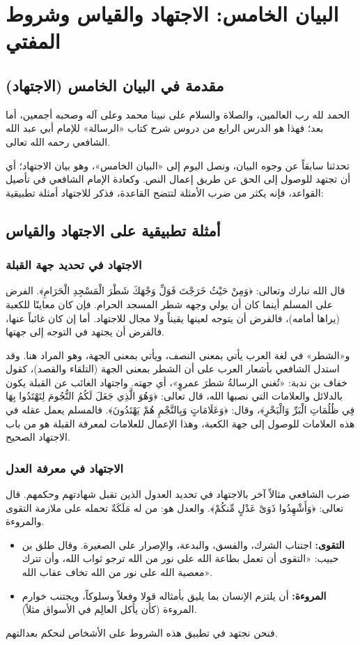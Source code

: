 \chapter{البيان الخامس: الاجتهاد والقياس وشروط المفتي}

\section{مقدمة في البيان الخامس (الاجتهاد)}
الحمد لله رب العالمين، والصلاة والسلام على نبينا محمد وعلى آله وصحبه أجمعين، أما بعد؛ فهذا هو الدرس الرابع من دروس شرح كتاب «الرسالة» للإمام أبي عبد الله الشافعي رحمه الله تعالى.

تحدثنا سابقاً عن وجوه البيان، ونصل اليوم إلى «البيان الخامس»، وهو بيان الاجتهاد؛ أي أن تجتهد للوصول إلى الحق عن طريق إعمال النص. وكعادة الإمام الشافعي في تأصيل القواعد، فإنه يكثر من ضرب الأمثلة لتتضح القاعدة، فذكر للاجتهاد أمثلة تطبيقية:

\section{أمثلة تطبيقية على الاجتهاد والقياس}

\subsection{الاجتهاد في تحديد جهة القبلة}
قال الله تبارك وتعالى: ﴿وَمِنْ حَيْثُ خَرَجْتَ فَوَلِّ وَجْهَكَ شَطْرَ الْمَسْجِدِ الْحَرَامِ﴾. الفرض على المسلم أينما كان أن يولي وجهه شطر المسجد الحرام. فإن كان معاينًا للكعبة (يراها أمامه)، فالفرض أن يتوجه لعينها يقيناً ولا مجال للاجتهاد. أما إن كان غائباً عنها، فالفرض أن يجتهد في التوجه إلى جهتها.

و«الشطر» في لغة العرب يأتي بمعنى النصف، ويأتي بمعنى الجهة، وهو المراد هنا. وقد استدل الشافعي بأشعار العرب على أن الشطر بمعنى الجهة (التلقاء والقصد)، كقول خفاف بن ندبة: «تُغني الرسالةُ شطرَ عمروٍ»، أي جهته. 
واجتهاد الغائب عن القبلة يكون بالدلائل والعلامات التي نصبها الله، قال تعالى: ﴿وَهُوَ الَّذِي جَعَلَ لَكُمُ النُّجُومَ لِتَهْتَدُوا بِهَا فِي ظُلُمَاتِ الْبَرِّ وَالْبَحْرِ﴾، وقال: ﴿وَعَلَامَاتٍ وَبِالنَّجْمِ هُمْ يَهْتَدُونَ﴾. فالمسلم يعمل عقله في هذه العلامات للوصول إلى جهة الكعبة، وهذا الإعمال للعلامات لمعرفة القبلة هو من باب الاجتهاد الصحيح.

\subsection{الاجتهاد في معرفة العدل}
ضرب الشافعي مثالاً آخر بالاجتهاد في تحديد العدول الذين تقبل شهادتهم وحكمهم. قال تعالى: ﴿وَأَشْهِدُوا ذَوَىْ عَدْلٍ مِّنكُمْ﴾. والعدل هو: من له مَلَكَةٌ تحمله على ملازمة التقوى والمروءة.
\begin{itemize}
    \item \textbf{التقوى:} اجتناب الشرك، والفسق، والبدعة، والإصرار على الصغيرة. وقال طلق بن حبيب: «التقوى أن تعمل بطاعة الله على نور من الله ترجو ثواب الله، وأن تترك معصية الله على نور من الله تخاف عقاب الله».
    \item \textbf{المروءة:} أن يلتزم الإنسان بما يليق بأمثاله قولا وفعلاً وسلوكاً، ويجتنب خوارم المروءة (كأن يأكل العالِم في الأسواق مثلاً).
\end{itemize}
فنحن نجتهد في تطبيق هذه الشروط على الأشخاص لنحكم بعدالتهم.


